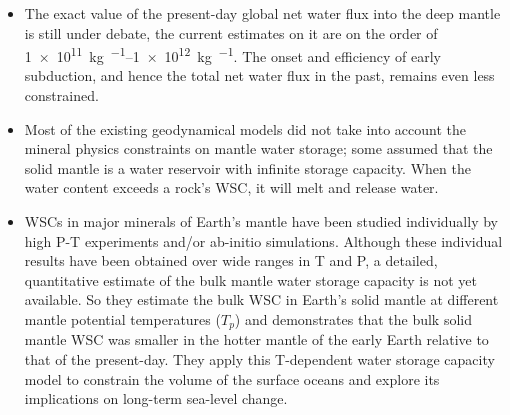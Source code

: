 \documentclass[aspectratio=1610]{beamer}
\begin{document}
\begingroup  %
\small
\begin{frame}
      \frametitle{\secname}
      \begin{itemize}
            \item The exact value of the present-day global net water flux into the deep
                  mantle is still under debate, the current estimates on it are on the order
                  of \SIrange{1e11}{1e12}{\kilo\gram\per\yr}. The onset and efficiency of
                  early subduction, and hence the total net water flux in the past, remains
                  even less constrained.
            \item Most of the existing geodynamical models did not take into account the
                  mineral physics constraints on mantle water storage; some assumed that the
                  solid mantle is a water reservoir with infinite storage capacity. When the
                  water content exceeds a rock's WSC, it will melt and release water.
            \item WSCs in major minerals of Earth's mantle have been studied individually by
                  high P-T experiments and/or ab-initio simulations. Although these
                  individual results have been obtained over wide ranges in T and P, a
                  detailed, quantitative estimate of the bulk mantle water storage capacity
                  is not yet available. So they estimate the bulk WSC in Earth's solid
                  mantle at different mantle potential temperatures ($T_p$) and demonstrates
                  that the bulk solid mantle WSC was smaller in the hotter mantle of the
                  early Earth relative to that of the present-day. They apply this
                  T-dependent water storage capacity model to constrain the volume of the
                  surface oceans and explore its implications on long-term sea-level change.
      \end{itemize}
\end{frame}
\endgroup
\end{document}
